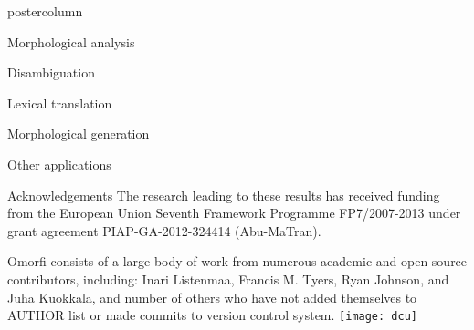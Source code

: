 \documentclass[final,hyperref={pdfpagelabels}]{beamer}
\begin{document}
\begin{frame}
\begin{columns}
\begin{column}{.49\textwidth}
\begin{beamercolorbox}[center,wd=\textwidth]{postercolumn}
\begin{minipage}[T]{.95\textwidth}
{\begin{block}{Morphological analysis}
        \end{block}

        \begin{block}{Disambiguation}

        \end{block}

        \begin{block}{Lexical translation}

        \end{block}

        \begin{block}{Morphological generation}

        \end{block}

        \begin{block}{Other applications}

        \end{block}

        \begin{block}{Acknowledgements}
            The research leading to these results has received
            funding from the European Union Seventh Framework
            Programme FP7/2007-2013 under grant agreement
            PIAP-GA-2012-324414 (Abu-MaTran).

            Omorfi consists of a large body of work from numerous academic and
            open source contributors, including: Inari Listenmaa, Francis M.
            Tyers, Ryan Johnson, and Juha Kuokkala, and number of others
            who have not added themselves to AUTHOR list or made commits
            to version control system.
    \texttt{[image: dcu]} 
            
      \end{block}
         }
        \end{minipage}
      \end{beamercolorbox}
    \end{column}
  \end{columns}

  \end{frame}
\end{document}
